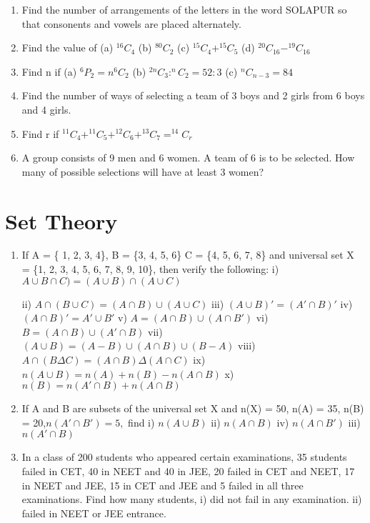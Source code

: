 \documentclass[14pt]{article}
\begin{document}
\begin{multicols}{2}
\begin{enumerate}[resume]
\item Find the number of arrangements of the letters
in the word SOLAPUR so that consonents
and vowels are placed alternately.

\item Find the value of  (a) $ ^{16}C_4 $
(b)  $ ^{80}C_2$
(c)  $ ^{15}C_4 + ^{15}C_5 $
(d)  $ ^{20}C_{16} - ^{19}C_{16} $

\item Find n if  (a) $ ^6P_2 = n ^6C_2 $
(b)  $ ^{2n}C_3 : ^nC_2 = 52:3$
(c)  $ ^nC_{n-3}=84$

\item Find the number of ways of selecting a team
of 3 boys and 2 girls from 6 boys and 4 girls.

\item Find r if  $ ^{11}C_4 + ^{11}C_5 + ^{12}C_6 +  ^{13}C_7=^{14}C_r$
 
 \item A group consists of 9 men and 6 women.
A team of 6 is to be selected. How many
of possible selections will have at least
3 women?
\end{enumerate} 


\section{Set Theory}
\noindent
\begin{enumerate}[resume]

\item  If A = \{ 1, 2, 3, 4\}, B = \{3, 4, 5, 6\}
		  C = \{4, 5, 6, 7, 8\} and universal set  X = \{1, 2, 3, 4, 5, 6, 7, 8, 9, 10\}, then verify
the following:
i)		$ A \cup B\cap C) = (A\cup B) \cap (A \cup C)$

ii)	$A\cap (B\cup C)=(A\cap B)\cup (A \cup C)$
iii) $(A\cup B)' = (A'\cap B)'         $
iv)	$ (A\cap B)' = A'\cup B'          $
v)	$	 A = (A\cap B)\cup (A\cap B') $
vi)	$	 B = (A\cap B)\cup (A'\cap B) $
vii) $(A\cup B)=(A-B)\cup (A\cap B)\cup (B-A)$
viii)	$A \cap (B\Delta C) = (A\cap B) \Delta (A\cap C)$
ix) $n (A\cup B) = n(A) + n(B) - n(A\cap B)$ 
x) $n (B) = n(A'\cap B) + n(A\cap B)$

\item If A and B are subsets of the universal set X and n(X) = 50, n(A) = 35, n(B) = 20,$ n(A'\cap B') = 5,$ find i) $n (A\cup B)$ ii) $n(A\cap B)$
iv) $ n(A\cap B')$
iii) $ n(A'\cap B) $

\item In a class of 200 students who appeared
certain examinations, 35 students failed
in CET, 40 in NEET and 40 in JEE,
20 failed in CET and NEET, 17 in NEET
and JEE, 15 in CET and JEE and 5 failed
in all three examinations. Find how many
students,
i)	did not fail in any examination.
ii) failed in NEET or JEE entrance.
		 

\end{enumerate}
\end{multicols}
\end{document}
